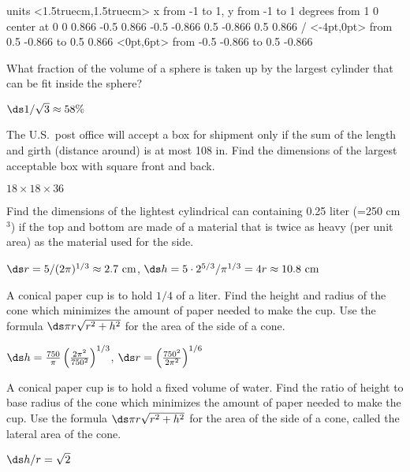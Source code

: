 \begin{exercises}
\figure
\vbox{\beginpicture
\normalgraphs
\ninepoint
\setcoordinatesystem units <1.5truecm,1.5truecm>
\setplotarea x from -1 to 1, y from -1 to 1
 degrees from 1 0 center at 0 0
\setlinear
{} 0.866 -0.5 0.866 -0.5 -0.866 0.5 -0.866 0.5 0.866 /
 <-4pt,0pt> from 0.5 -0.866 to 0.5 0.866
 <0pt,6pt> from -0.5 -0.866 to 0.5 -0.866
\endpicture}



\exercise
What fraction of the volume of a sphere is taken up by the largest cylinder
that can be fit inside the sphere?
\begin{answer} $\ds 1/\sqrt3\approx 58\%$
\end{answer}

\exercise
The U.S.~post office will accept a box for shipment only if the sum of the
length and girth (distance around) is at most 108 in.  Find the dimensions
of the largest acceptable box with square front and back.
\begin{answer} $18\times18\times36$
\end{answer}

\exercise
Find the dimensions of the lightest cylindrical can containing 0.25 liter
(=250 cm${}^3$) if the top and bottom are made of a material that is twice
as heavy (per unit area) as the material used for the side.
\begin{answer} $\ds r=5/(2\pi)^{1/3}\approx 2.7\hbox{ cm}$,\hfill\break
$\ds h=5\cdot2^{5/3}/\pi^{1/3}=4r\approx 10.8 \hbox{ cm}$
\end{answer}

\exercise A conical paper cup is to hold $1/4$ of a liter. Find the
height and radius of the cone which minimizes
the amount of paper needed to make the cup.  Use the formula $\ds \pi
r\sqrt{r^2+h^2}$ for the area of the side of a cone.
\begin{answer} $\ds h={750\over\pi}\left({2\pi^2\over 750^2}\right)^{1/3}$, 
$\ds r=\left({750^2\over 2\pi^2}\right)^{1/6}$
\end{answer}

\exercise A conical paper cup is to hold a fixed volume of water.
Find the ratio of height to base radius of the cone which minimizes
the amount of paper needed to make the cup.  Use the formula $\ds \pi
r\sqrt{r^2+h^2}$ for the area of the side of a cone, called the
{\dfont lateral area\/} of the cone.
\begin{answer} $\ds h/r=\sqrt2$
\end{answer}


\end{exercises}
